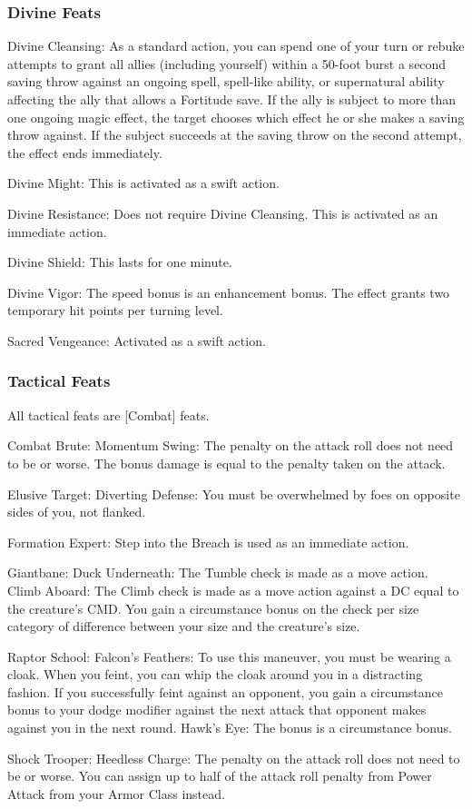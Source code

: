 \subsubsection{Divine Feats}
\begin{itemize*}
\item Divine Cleansing: As a standard action, you can spend one of your turn or rebuke attempts to grant all allies (including yourself) within a 50-foot burst a second saving throw against an ongoing spell, spell-like ability, or supernatural ability affecting the ally that allows a Fortitude save. If the ally is subject to more than one ongoing magic effect, the target chooses which effect he or she makes a saving throw against. If the subject succeeds at the saving throw on the second attempt, the effect ends immediately.
\item Divine Might: This is activated as a swift action.
\item Divine Resistance: Does not require Divine Cleansing. This is activated as an immediate action.
\item Divine Shield: This lasts for one minute.
\item Divine Vigor: The speed bonus is an enhancement bonus. The effect grants two temporary hit points per turning level.
\item Sacred Vengeance: Activated as a swift action.
\end{itemize*}
\subsubsection{Tactical Feats}
All tactical feats are [Combat] feats.
\begin{itemize*}
\item Combat Brute: Momentum Swing: The penalty on the attack roll does not need to be  or worse. The bonus damage is equal to the penalty taken on the attack.
\item Elusive Target: Diverting Defense: You must be overwhelmed by foes on opposite sides of you, not flanked.
\item Formation Expert: Step into the Breach is used as an immediate action.
\item Giantbane: Duck Underneath: The Tumble check is made as a move action. Climb Aboard: The Climb check is made as a move action against a DC equal to the creature's CMD. You gain a  circumstance bonus on the check per size category of difference between your size and the creature's size.
\item Raptor School: Falcon's Feathers: To use this maneuver, you must be wearing a cloak. When you feint, you can whip the cloak around you in a distracting fashion. If you successfully feint against an opponent, you gain a  circumstance bonus to your dodge modifier against the next attack that opponent makes against you in the next round. Hawk's Eye: The bonus is a circumstance bonus.
\item Shock Trooper: Heedless Charge: The penalty on the attack roll does not need to be  or worse. You can assign up to half of the attack roll penalty from Power Attack from your Armor Class instead.
\end{itemize*}
